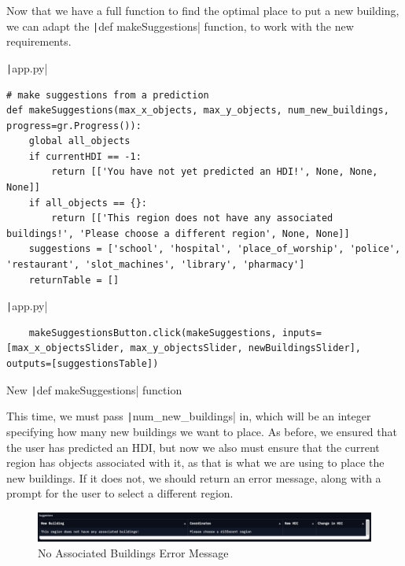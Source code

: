 \documentclass[12pt]{report}
\newcommand{\pil}[1]{\protect\texttt|#1|}
\begin{document}
Now that we have a full function to find the optimal place to put a new building, we can adapt the \pil{def makeSuggestions} function, to work with the new requirements.

\begin{listing}[H]
\pil{app.py}
\begin{verbatim}
# make suggestions from a prediction
def makeSuggestions(max_x_objects, max_y_objects, num_new_buildings, progress=gr.Progress()):
    global all_objects
    if currentHDI == -1:
        return [['You have not yet predicted an HDI!', None, None, None]]
    if all_objects == {}:
        return [['This region does not have any associated buildings!', 'Please choose a different region', None, None]]
    suggestions = ['school', 'hospital', 'place_of_worship', 'police', 'restaurant', 'slot_machines', 'library', 'pharmacy']
    returnTable = []
\end{verbatim}
\pil{app.py}
\begin{verbatim}
    makeSuggestionsButton.click(makeSuggestions, inputs=[max_x_objectsSlider, max_y_objectsSlider, newBuildingsSlider], outputs=[suggestionsTable])
\end{verbatim}
\caption{New \pil{def makeSuggestions} function}\label{cs:newMakeSuggestions}
\end{listing}

This time, we must pass \pil{num_new_buildings} in, which will be an integer specifying how many new buildings we want to place. As before, we ensured that the user has predicted an HDI, but now we also must ensure that the current region has objects associated with it, as that is what we are using to place the new buildings. If it does not, we should return an error message, along with a prompt for the user to select a different region.

\begin{figure}[H]
\centering
\includegraphics[width=14cm]{ss21.2.png}
\caption{No Associated Buildings Error Message}\label{fig:ss21.2}
\end{figure}

\begin{center}
\end{center}
\end{document}
